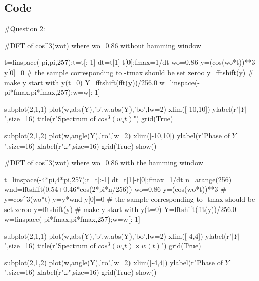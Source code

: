 \documentclass[11pt]{article}
\begin{document}
\subsection{Code}
\begin{python}
#Question 2:

#DFT of cos^3(wot) where wo=0.86 without hamming window

t=linspace(-pi,pi,257);t=t[:-1]
dt=t[1]-t[0];fmax=1/dt
wo=0.86
y=(cos(wo*t))**3
y[0]=0 # the sample corresponding to -tmax should be set zeroo
y=fftshift(y) # make y start with y(t=0)
Y=fftshift(fft(y))/256.0
w=linspace(-pi*fmax,pi*fmax,257);w=w[:-1]

subplot(2,1,1)
plot(w,abs(Y),'b',w,abs(Y),'bo',lw=2)
xlim([-10,10])
ylabel(r"$|Y|$",size=16)
title(r"Spectrum of $cos^3(w_ot)$")
grid(True)


subplot(2,1,2)
plot(w,angle(Y),'ro',lw=2)
xlim([-10,10])
ylabel(r"Phase of $Y$",size=16)
xlabel(r"$\omega$",size=16)
grid(True)
show()



#DFT of cos^3(wot) where wo=0.86 with the hamming window


t=linspace(-4*pi,4*pi,257);t=t[:-1]
dt=t[1]-t[0];fmax=1/dt
n=arange(256)
wnd=fftshift(0.54+0.46*cos(2*pi*n/256))
wo=0.86
y=(cos(wo*t))**3
# y=cos^3(wo*t)
y=y*wnd
y[0]=0 # the sample corresponding to -tmax should be set zeroo
y=fftshift(y) # make y start with y(t=0)
Y=fftshift(fft(y))/256.0
w=linspace(-pi*fmax,pi*fmax,257);w=w[:-1]


subplot(2,1,1)
plot(w,abs(Y),'b',w,abs(Y),'bo',lw=2)
xlim([-4,4])
ylabel(r"$|Y|$",size=16)
title(r"Spectrum of $cos^3(w_ot)\times w(t)$")
grid(True)


subplot(2,1,2)
plot(w,angle(Y),'ro',lw=2)
xlim([-4,4])
ylabel(r"Phase of $Y$",size=16)
xlabel(r"$\omega$",size=16)
grid(True)
show()
\end{python}
\end{document}
